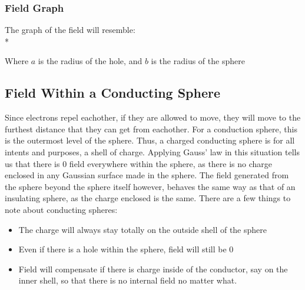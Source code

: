 \documentclass[a4paper,12pt]{article}
\begin{document}
					\subsubsection{Field Graph}
					 The graph of the field will resemble:\\*

					 Where $a$ is the radius of the hole, and $b$ is the radius of the sphere


				\subsection{Field Within a Conducting Sphere}
						Since electrons repel eachother, if they are allowed to move, they will move to the furthest distance that they can get from eachother. For a conduction sphere, this is the outermost level of the sphere. Thus, a charged conducting sphere is for all intents and purposes, a shell of charge. Applying Gauss' law in this situation tells us that there is 0 field everywhere within the sphere, as there is no charge enclosed in any Gaussian surface made in the sphere. The field generated from the sphere beyond the sphere itself however, behaves the same way as that of an insulating sphere, as the charge enclosed is the same. 
						There are a few things to note about conducting spheres:
						\begin{itemize}
								\item The charge will always stay totally on the outside shell of the sphere
								\item Even if there is a hole within the sphere, field will still be 0
								\item Field will compensate if there is charge inside of the conductor, say on the inner shell, so that there is no internal field no matter what. 
						\end{itemize}
\end{document}
